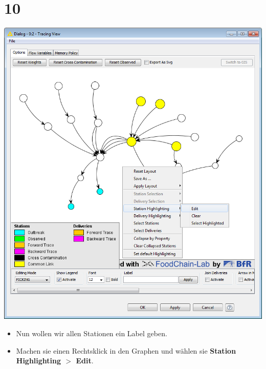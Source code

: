 \documentclass{beamer}
\begin{document}
\section{10}
\begin{frame}
	\begin{center}
  		\includegraphics[height=0.6\textheight]{10.png}
	\end{center}
	\begin{itemize}
		\item Nun wollen wir allen Stationen ein Label geben.
		\item Machen sie einen Rechtsklick in den Graphen und wählen sie \textbf{Station Highlighting $>$ Edit}.
	\end{itemize}
\end{frame}
\end{document}
